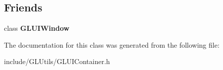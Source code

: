 \subsection*{Friends}
\begin{DoxyCompactItemize}
\item 
\hypertarget{classCartWheel_1_1GL_1_1GLUIContainer_a074a446538cbd67fef31b2702b8ec93f}{
class {\bfseries GLUIWindow}}
\label{classCartWheel_1_1GL_1_1GLUIContainer_a074a446538cbd67fef31b2702b8ec93f}

\end{DoxyCompactItemize}


The documentation for this class was generated from the following file:\begin{DoxyCompactItemize}
\item 
include/GLUtils/GLUIContainer.h\end{DoxyCompactItemize}
